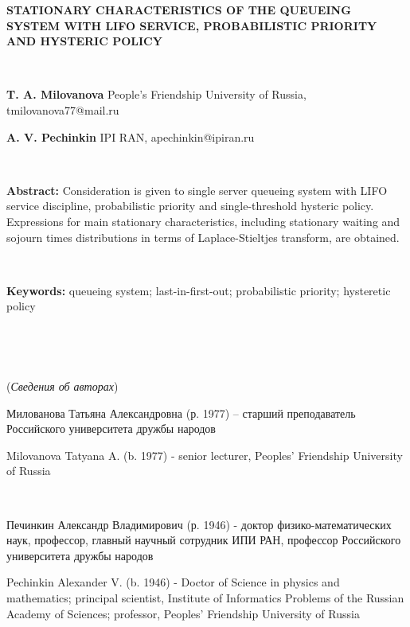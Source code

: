 {\bf STATIONARY CHARACTERISTICS OF THE QUEUEING SYSTEM
WITH LIFO SERVICE, PROBABILISTIC PRIORITY AND HYSTERIC POLICY}

\ \

{\bf T. A. Milovanova} People's Friendship University of
Russia, tmilovanova77@mail.ru

{\bf A. V. Pechinkin} IPI RAN, apechinkin@ipiran.ru


\ \

{\bf Abstract:}
Consideration is given to single server
queueing system with LIFO service discipline,
probabilistic priority and single-threshold
hysteric policy.
Expressions for main stationary
characteristics, including stationary
waiting and sojourn times distributions in terms of
Laplace-Stieltjes transform, are obtained.


\ \

{\bf Keywords:}
queueing system; last-in-first-out; probabilistic priority; hysteretic policy


\ \

\ \

({\it Сведения об авторах})

Милованова Татьяна Александровна (р. 1977) -- старший преподаватель
Российского университета дружбы народов

Milovanova Tatyana A. (b. 1977) - senior lecturer, Peoples'
Friendship University of Russia

\ \

Печинкин Александр Владимирович (р. 1946) - доктор
физико-математических наук, профессор, главный научный сотрудник ИПИ
РАН, профессор Российского университета дружбы народов


Pechinkin Alexander V. (b. 1946) - Doctor of Science in physics and
mathematics; principal scientist, Institute of Informatics Problems
of the Russian Academy of Sciences; professor, Peoples' Friendship
University of Russia


